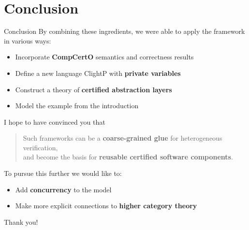 \documentclass[aspectratio=1610,mathserif]{beamer}
\begin{document}
\section{Conclusion}

\begin{frame}{Conclusion}
  By combining these ingredients,
  we were able to apply the framework in various ways:
  \begin{itemize}
    \pause
    \item Incorporate \textbf{CompCertO} semantics and correctness results
    \pause
    \item Define a new language ClightP with \textbf{private variables}
    \pause
    \item Construct a theory of \textbf{certified abstraction layers}
    \pause
    \item Model the example from the introduction
  \end{itemize}

  \pause
  I hope to have convinced you that
  \begin{quote}
    Such frameworks can be a
    \textbf{coarse-grained glue} for heterogeneous verification, \\
    and become the basis for
    \textbf{reusable certified software components}.
  \end{quote}

  \pause
  To pursue this further we would like to:
  \begin{itemize}
    \item Add \textbf{concurrency} to the model
    \pause
    \item Make more explicit connections to \textbf{higher category theory}
  \end{itemize}
\end{frame}

\begin{frame}
  \Large \centering Thank you!
\end{frame}
\end{document}
